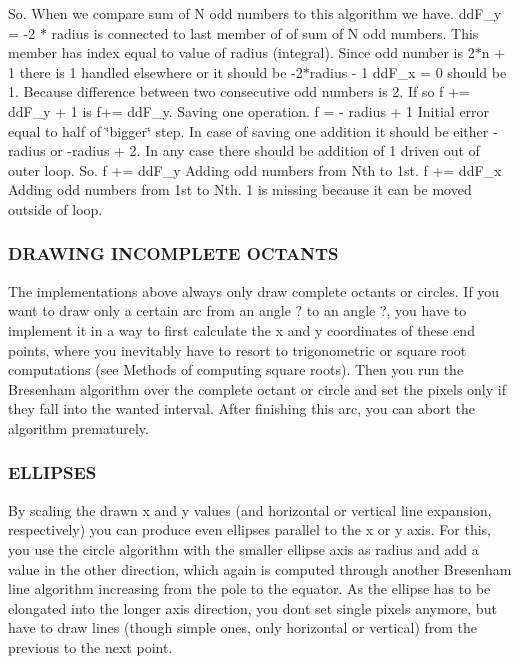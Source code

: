 So. When we compare sum of N odd numbers to this algorithm we have. dd\+F\+\_\+y = -\/2 $\ast$ radius is connected to last member of of sum of N odd numbers. This member has index equal to value of radius (integral). Since odd number is 2$\ast$n + 1 there is 1 handled elsewhere or it should be -\/2$\ast$radius -\/ 1 dd\+F\+\_\+x = 0 should be 1. Because difference between two consecutive odd numbers is 2. If so f += dd\+F\+\_\+y + 1 is f+= dd\+F\+\_\+y. Saving one operation. f = -\/ radius + 1 Initial error equal to half of \char`\"{}bigger\char`\"{} step. In case of saving one addition it should be either -\/radius or -\/radius + 2. In any case there should be addition of 1 driven out of outer loop. So. f += dd\+F\+\_\+y Adding odd numbers from Nth to 1st. f += dd\+F\+\_\+x Adding odd numbers from 1st to Nth. 1 is missing because it can be moved outside of loop.

\subsubsection*{D\+R\+A\+W\+I\+NG I\+N\+C\+O\+M\+P\+L\+E\+TE O\+C\+T\+A\+N\+TS}

The implementations above always only draw complete octants or circles. If you want to draw only a certain arc from an angle ? to an angle ?, you have to implement it in a way to first calculate the x and y coordinates of these end points, where you inevitably have to resort to trigonometric or square root computations (see Methods of computing square roots). Then you run the Bresenham algorithm over the complete octant or circle and set the pixels only if they fall into the wanted interval. After finishing this arc, you can abort the algorithm prematurely.

\subsubsection*{E\+L\+L\+I\+P\+S\+ES}

By scaling the drawn x and y values (and horizontal or vertical line expansion, respectively) you can produce even ellipses parallel to the x or y axis. For this, you use the circle algorithm with the smaller ellipse axis as radius and add a value in the other direction, which again is computed through another Bresenham line algorithm increasing from the pole to the equator. As the ellipse has to be elongated into the longer axis direction, you don\textquotesingle{}t set single pixels anymore, but have to draw lines (though simple ones, only horizontal or vertical) from the previous to the next point.

